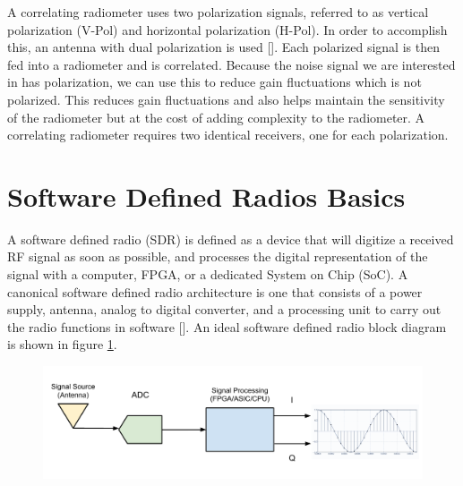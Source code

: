 A correlating radiometer uses two polarization signals, referred to as vertical polarization (V-Pol) and horizontal polarization (H-Pol).  In order to accomplish this, an antenna with dual polarization is used [\cite{Fujimoto}].  Each polarized signal is then fed into a radiometer and is correlated.  Because the noise signal we are interested in has polarization, we can use this to reduce gain fluctuations which is not polarized.  This reduces gain fluctuations and also helps maintain the sensitivity of the radiometer but at the cost of adding complexity to the radiometer. A correlating radiometer requires two identical receivers, one for each polarization. 




 
\section{Software Defined Radios Basics} 
A software defined radio (SDR) is defined as a device that will digitize a received RF signal as soon as possible, and processes the digital representation of the signal with a computer, FPGA, or a dedicated System on Chip (SoC).  A canonical software defined radio architecture is one that consists of a power supply, antenna, analog to digital converter, and a processing unit to carry out the radio functions in software [\cite{Mitola1995}]. An ideal software defined radio block diagram is shown in figure \ref{ideal_sdr}.

{\begin{figure}[h!tb] 
\centering
\includegraphics[width=\textwidth]{Images/SDR_Ideal_block.pdf}
\label{ideal_sdr}
\end{figure}
}

